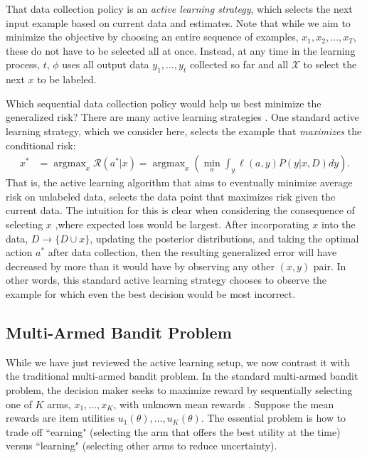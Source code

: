 \documentclass[blindrev,mnsc]{informs3}
\newcommand{\numitems}{K}
\newcommand{\risk}{\mathcal{R}}
\begin{document}
That data collection policy is an \emph{active learning strategy}, which selects the next input example based on current data and estimates. Note that while we aim to minimize the objective by choosing an entire sequence of examples, $x_1,x_2,\ldots,x_T$, these do not have to be selected all at once. Instead, at any time in the learning process, $t$, $\phi$ uses all output data $y_1,\ldots,y_t$ collected so far and all $\mathcal{X}$ to select the next $x$ to be labeled. 

Which sequential data collection policy would help us best minimize the generalized risk? There are many active learning strategies \citep{balcan2009agnostic,balcan2010true,dasgupta2008general,fu2013survey}. One standard active learning strategy, which we consider here, selects the example that \emph{maximizes} the conditional risk:
\begin{align}
x^{*}  &= \mathop{\text{arg}\max}_x \risk(a^{*}|x) 
= \mathop{\text{arg}\max}_{x} \left( \min_{a} \int_y \ell(a,y) P(y|x,D) dy \right).
\end{align}
That is, the active learning algorithm that aims to eventually minimize average risk on unlabeled data, selects the data point that maximizes risk given the current data.  The intuition for this is clear when considering the consequence of selecting $x$ ,where expected loss would be largest. After incorporating $x$ into the data, $D \to \{D \cup x \}$, updating the posterior distributions, and taking the optimal action $a^{*}$ after data collection, then the resulting generalized error will have decreased by more than it would have by observing any other $(x,y)$ pair. In other words, this standard active learning strategy chooses to observe the example for which even the best decision would be most incorrect. 


\subsection{Multi-Armed Bandit Problem}

While we have just reviewed the active learning setup, we now contrast it with the traditional multi-armed bandit problem. In the standard multi-armed bandit problem, the decision maker seeks to maximize reward by sequentially selecting one of $\numitems$ arms, $x_1,\ldots,x_\numitems$, with unknown mean rewards \citep{GittinsEtAl2011,Robbins1952,thompson1933likelihood}. Suppose the mean rewards are item utilities $u_1(\theta), \ldots, u_\numitems(\theta)$. The essential problem is how to trade off ``earning" (selecting the arm that offers the best utility at the time) versus ``learning" (selecting other arms to reduce uncertainty). 
\end{document}
